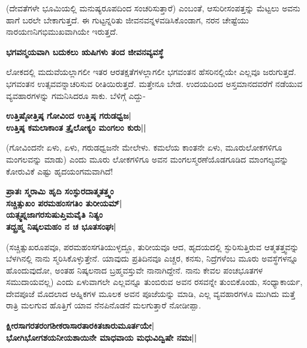 (ದೇವತೆಗಳೇ ಭೂಮಿಯಲ್ಲಿ ಮನುಷ್ಯರೂಪದಿಂದ ಸಂಚರಿಸುತ್ತಾರೆ) ಎಂಬಂತೆ, ಆಸುರೀಸಂಪತ್ತನ್ನು ಮೆಟ್ಟಲು ಅವನು ಹಾಗೆ ಬರಲೇ ಬೇಕಾಗುತ್ತದೆ. ಈ ಗುಟ್ಟನ್ನರಿತು ಜೀವನವನ್ನಳವಡಿಸಿಕೊಂಡಾಗ, ನರನ ಚೇಷ್ಟೆಯು ನಾರಯಣನಿಗಭಿಮುಖವಾಗಿಯೇ ಇರುತ್ತದೆ. 


\large{\bf{ಭಗವನ್ಮಯವಾಗಿ ಬದುಕಲು ಋಷಿಗಳು ತಂದ ಜೀವನವ್ಯವಸ್ಥೆ}} 


ಲೋಕದಲ್ಲಿ ಮದುವೆಯಲ್ಲಾಗಲೀ ಇತರ ಆರತಕ್ಷತೆಗಳಲ್ಲಾಗಲೀ ಭಗವಂತನ ಹೆಸರಿನಲ್ಲಿಯೇ ಎಲ್ಲವೂ ಜರುಗುತ್ತದೆ. ಭಗವಂತನ ಉತ್ಸವವನ್ನಾಚರಿಸುವ ರೀತಿಯಿರುತ್ತದೆ. ಮತ್ತೇನೂ ಬೇಡ. ಉದಯದಿಂದ ಅಸ್ತಮಾನದವರೆಗೆ ನಡೆಯುವ ವ್ಯವಹಾರಗಳನ್ನು ಗಮನಿಸಿದರೂ ಸಾಕು. ಬೆಳಿಗ್ಗೆ ಎದ್ದು- 


\begin{center} 

{\bf ಉತ್ತಿಷ್ಠೋತ್ತಿಷ್ಠ ಗೋವಿಂದ ಉತ್ತಿಷ್ಠ ಗರುಡಧ್ವಜ|\\ 

ಉತ್ತಿಷ್ಠ ಕಮಲಾಕಾಂತ ತ್ರೈಲೋಕ್ಯಂ ಮಂಗಲಂ ಕುರು||} 

\end{center} 


(ಗೋವಿಂದನೇ ಏಳು, ಏಳು, ಗರುಡಧ್ವಜನೇ ಮೇಲೇಳು. ಕಮಲೆಯ ಕಾಂತನೇ ಏಳು, ಮೂರುಲೋಕಗಳಿಗೂ ಮಂಗಲವನ್ನು ಮಾಡು) ಎಂದು ಮೂರು ಲೋಕಗಳಿಗೂ ಅವನ ಮಂಗಲಸ್ಮರಣೆಯೊಡಗೂಡಿದ ಮಾಂಗಲ್ಯವನ್ನು ಕೋರುವಿಕೆ ಎಷ್ಟು ಹೃದಯಂಗಮವಾಗಿದೆ! 


\begin{center} 

{\bf ಪ್ರಾತಃ ಸ್ಮರಾಮಿ ಹೃದಿ ಸಂಸ್ಫುರದಾತ್ಮತತ್ತ್ವಂ\\ 

ಸಚ್ಚಿತ್ಸುಖಂ ಪರಮಹಂಸಗತಿಂ ತುರೀಯಮ್‍|\\ 

ಯತ್ಸ್ವಪ್ನಜಾಗರಸುಷುಪ್ತಿಮವೈತಿ ನಿತ್ಯಂ\\ 

ತದ್ಬ್ರಹ್ಮ ನಿಷ್ಕಲಮಹಂ ನ ಚ ಭೂತಸಂಘಃ|} 

\end{center} 


(ಸಚ್ಚಿತ್ಸುಖರೂಪವೂ, ಪರಮಹಂಸಗತಿಯುಳ್ಳದ್ದೂ, ತುರೀಯವೂ ಆದ, ಹೃದಯದಲ್ಲಿ ಸ್ಫುರಿಸುತ್ತಿರುವ ಆತ್ಮತತ್ತ್ವವನ್ನು ಬೆಳಗಿನಲ್ಲಿ ನಾನು ಸ್ಮರಿಸಿಕೊಳ್ಳುತ್ತೇನೆ. ಯಾವುದು ಪ್ರತಿದಿನವೂ ಎಚ್ಚರ, ಕನಸು, ನಿದ್ರೆಗಳೆಂಬ ಮೂರು ಅವಸ್ಥೆಗಳನ್ನೂ ಹೊಂದುವುದೋ, ಅಂತಹ ನಿಷ್ಕಲನಾದ ಬ್ರಹ್ಮವಸ್ತುವೇ ನಾನಾಗಿದ್ದೇನೆ. ನಾನು ಕೇವಲ ಪಂಚಭೂತಗಳ ಸಮುದಾಯವಲ್ಲ) ಎಂದು ಏಳುವಾಗಲೇ ಎಲ್ಲವನ್ನೂ ತುಂಬಿರುವ ಅವನ ರಸವನ್ನೇ ತುಂಬಿಕೊಂಡು, ಸಂಧ್ಯಾಕಾರ್ಯ, ದೇವಪೂಜೆ ಮೊದಲಾದ ಆಹ್ನಿಕಗಳ ಮೂಲಕ ಅವನ ಪೂಜೆಯನ್ನು ಮಾಡಿ, ಎಲ್ಲ ವ್ಯವಹಾರಗಳೂ ಮುಗಿದು ಮತ್ತೆ ರಾತ್ರಿ ಮಲಗುವ ಹೊತ್ತಿಗೆ ಯಾವ ನೆನಪಿನೊಡನೆ ಮಲಗುತ್ತಾರೆ ನೋಡೀಪ್ಪಾ. 


\begin{center} 

{\bf ಕ್ಷೀರಸಾಗರತರಂಗಶೀಕರಾಸಾರತಾರಕಿತಚಾರುಮೂರ್ತಯೇ|\\ 

ಭೋಗಿಭೋಗಶಯನೀಯಶಾಯಿನೇ ಮಾಧವಾಯ ಮಧುವಿದ್ವಿಷೇ ನಮಃ||} 

\end{center} 


